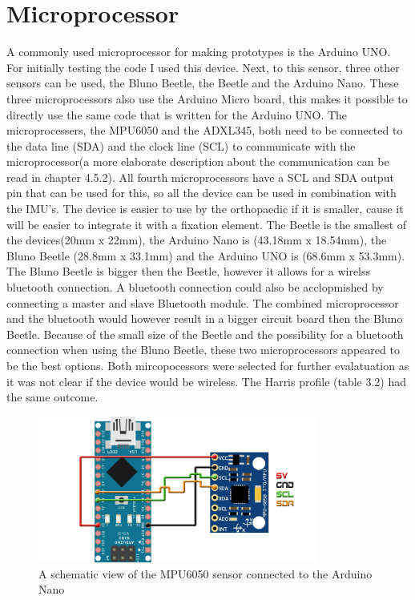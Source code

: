 \documentclass[whitelogo]{tudelft-report}
\begin{document}
{{{\section{Microprocessor}
A commonly used microprocessor for making prototypes is the Arduino UNO. For initially testing the code I used this device. Next, to this sensor, three other sensors can be used, the Bluno Beetle, the Beetle and the Arduino Nano. These three microprocessors also use the Arduino Micro board, this makes it possible to directly use the same code that is written for the Arduino UNO. The  microprocessers, the MPU6050 and the ADXL345, both need to be connected to the data line (SDA) and the clock line (SCL) to communicate with the microprocessor(a more elaborate description about the communication can be read in chapter 4.5.2). All fourth microprocessors have a SCL and SDA output pin that can be used for this, so all the device can be used in combination with the IMU's. The device is easier to use by the orthopaedic if it is smaller, cause it will be easier to integrate it with a fixation element. The Beetle is the smallest of the devices(20mm x 22mm), the Arduino Nano is (43.18mm x 18.54mm), the Bluno Beetle (28.8mm x 33.1mm) and the Arduino UNO is (68.6mm x 53.3mm). The Bluno Beetle is bigger then the Beetle, however it allows for a wirelss bluetooth connection. A bluetooth connection could also be acclopmished by connecting a master and slave Bluetooth module. The combined microprocessor and the bluetooth would however result in a bigger circuit board then the Bluno Beetle. Because of the small size of the Beetle and the possibility for a bluetooth connection when using the Bluno Beetle, these two microprocessors appeared to be the best options. Both mircopocessors were selected for further evalatuation as it was not clear if the device would be wireless. The Harris profile (table 3.2) had the same outcome.
\begin{figure}[!htb]
	\centering\includegraphics[width=260pt]{IMU_schematic.jpg}
	\caption{A schematic view of the MPU6050 sensor connected to the Arduino Nano~\cite{MPU6050connectedtoMicroprocessor}}
\end{figure}

}}}
\end{document}
